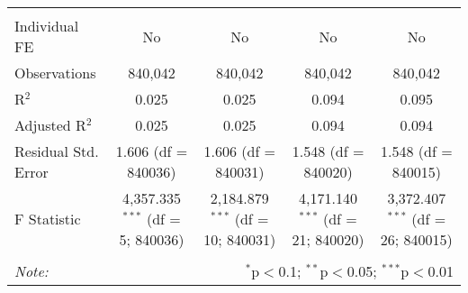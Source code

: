 \documentclass[
]{article}
\begin{document}
\begin{table}[!htbp]
{\begin{tabular}{@{\extracolsep{5pt}}lcccc}
  & & & & \\ 
\hline \\[-1.8ex] 
Individual FE & No & No & No & No \\ 
Observations & 840,042 & 840,042 & 840,042 & 840,042 \\ 
R$^{2}$ & 0.025 & 0.025 & 0.094 & 0.095 \\ 
Adjusted R$^{2}$ & 0.025 & 0.025 & 0.094 & 0.094 \\ 
Residual Std. Error & 1.606 (df = 840036) & 1.606 (df = 840031) & 1.548 (df = 840020) & 1.548 (df = 840015) \\ 
F Statistic & 4,357.335$^{***}$ (df = 5; 840036) & 2,184.879$^{***}$ (df = 10; 840031) & 4,171.140$^{***}$ (df = 21; 840020) & 3,372.407$^{***}$ (df = 26; 840015) \\ 
\hline 
\hline \\[-1.8ex] 
\textit{Note:}  & \multicolumn{4}{r}{$^{*}$p$<$0.1; $^{**}$p$<$0.05; $^{***}$p$<$0.01} \\ 
\end{tabular}
} 
\end{table} 
\newpage
\end{document}
